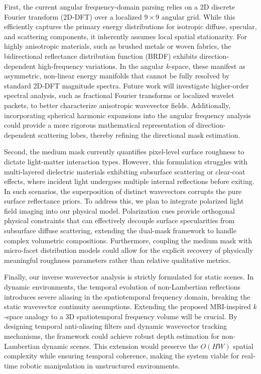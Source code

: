 \documentclass[lettersize,journal]{IEEEtran}
\begin{document}
First, the current angular frequency-domain parsing relies on a 2D discrete Fourier transform (2D-DFT) over a localized $9 \times 9$ angular grid. While this efficiently captures the primary energy distributions for isotropic diffuse, specular, and scattering components, it inherently assumes local spatial stationarity. For highly anisotropic materials, such as brushed metals or woven fabrics, the bidirectional reflectance distribution function (BRDF) exhibits direction-dependent high-frequency variations. In the angular $k$-space, these manifest as asymmetric, non-linear energy manifolds that cannot be fully resolved by standard 2D-DFT magnitude spectra. Future work will investigate higher-order spectral analysis, such as fractional Fourier transforms or localized wavelet packets, to better characterize anisotropic wavevector fields. Additionally, incorporating spherical harmonic expansions into the angular frequency analysis could provide a more rigorous mathematical representation of direction-dependent scattering lobes, thereby refining the directional mask estimation.

Second, the medium mask currently quantifies pixel-level surface roughness to dictate light-matter interaction types. However, this formulation struggles with multi-layered dielectric materials exhibiting subsurface scattering or clear-coat effects, where incident light undergoes multiple internal reflections before exiting. In such scenarios, the superposition of distinct wavevectors corrupts the pure surface reflectance priors. To address this, we plan to integrate polarized light field imaging into our physical model. Polarization cues provide orthogonal physical constraints that can effectively decouple surface specularities from subsurface diffuse scattering, extending the dual-mask framework to handle complex volumetric compositions. Furthermore, coupling the medium mask with micro-facet distribution models could allow for the explicit recovery of physically meaningful roughness parameters rather than relative qualitative metrics.

Finally, our inverse wavevector analysis is strictly formulated for static scenes. In dynamic environments, the temporal evolution of non-Lambertian reflections introduces severe aliasing in the spatiotemporal frequency domain, breaking the static wavevector continuity assumptions. Extending the proposed MRI-inspired $k$-space analogy to a 3D spatiotemporal frequency volume will be crucial. By designing temporal anti-aliasing filters and dynamic wavevector tracking mechanisms, the framework could achieve robust depth estimation for non-Lambertian dynamic scenes. This extension would preserve the $O(HW)$ spatial complexity while ensuring temporal coherence, making the system viable for real-time robotic manipulation in unstructured environments.



\end{document}
